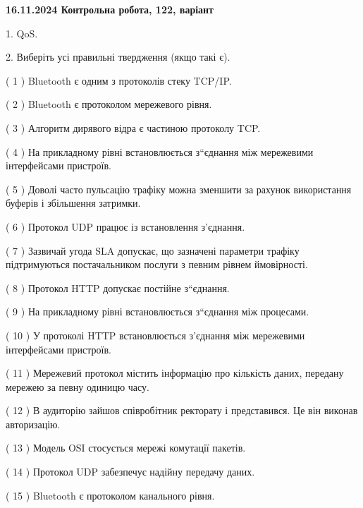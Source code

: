 \documentclass[12pt, ukrainian]{article}
\begin{document}
\vspace{4mm}
\newpage
\begin {large}

\textbf{16.11.2024 Контрольна робота, 122, варіант  }\par


{
1. QoS.



\vspace{5mm}
2. Виберіть усі правильні твердження (якщо такі є).\par
\vspace{2mm}

( 1 ) Bluetooth є одним з протоколів стеку TCP/IP.

( 2 ) Bluetooth є протоколом мережевого рівня.

( 3 ) Алгоритм дирявого відра є частиною протоколу TCP.

( 4 ) На прикладному рівні встановлюється з“єднання між мережевими інтерфейсами пристроїв.

( 5 ) Доволі часто пульсацію трафіку можна зменшити за рахунок використання буферів і збільшення затримки.

( 6 ) Протокол UDP працює із встановлення з'єднання.

( 7 ) Зазвичай угода  SLA допускає, що зазначені параметри трафіку підтримуються постачальником послуги з певним рівнем ймовірності.

( 8 ) Протокол  HTTP допускає постійне з“єднання.

( 9 ) На прикладному рівні встановлюється з“єднання між процесами.

( 10 ) У протоколі HTTP встановлюється з'єднання між мережевими інтерфейсами пристроїв.

( 11 ) Мережевий протокол містить інформацію про кількість даних, передану мережею за певну одиницю часу.

( 12 ) В аудиторію зайшов співробітник ректорату і представився. Це він виконав авторизацію.

( 13 ) Модель OSI стосується мережі комутації пакетів.

( 14 ) Протокол UDP забезпечує надійну передачу даних.

( 15 ) Bluetooth є протоколом канального рівня.
}
\end {large}
\end{document}
